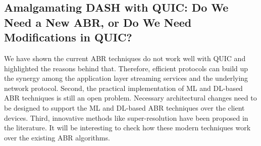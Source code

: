 \subsection{Amalgamating DASH with QUIC: Do We Need a New ABR, or Do We Need Modifications in QUIC?}
We have shown the current ABR techniques do not work well with QUIC and highlighted the reasons behind that. Therefore, efficient protocols can build up the synergy among the application layer streaming services and the underlying network protocol. Second, the practical implementation of ML and DL-based ABR techniques is still an open problem. Necessary architectural changes need to be designed to support the ML and DL-based ABR techniques over the client devices. Third, innovative methods like super-resolution have been proposed in the literature. It will be interesting to check how these modern techniques work over the existing ABR algorithms. 